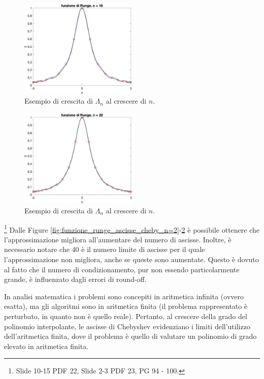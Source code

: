 \begin{figure}
	\centering
	\includegraphics[width=0.5\textwidth]{immagini/funzione_runge_ascisse_cheby_n=18.jpg}
	\caption{Esempio di crescita di $\Lambda_n$ al crescere di $n$.}\label{fig:funzione_runge_ascisse_cheby_n=18}
\end{figure}

\begin{figure}
	\centering
	\includegraphics[width=0.5\textwidth]{immagini/funzione_runge_ascisse_cheby_n=22.jpg}
	\caption{Esempio di crescita di $\Lambda_n$ al crescere di $n$.}\label{fig:funzione_runge_ascisse_cheby_n=22}
\end{figure}

 \footnote{Slide 10-15 PDF 22, Slide 2-3 PDF 23, PG 94 - 100.} Dalle Figure \ref{fig:funzione_runge_ascisse_cheby_n=2}-\ref{fig:funzione_runge_ascisse_cheby_n=22} è possibile ottenere che l'approssimazione migliora all'aumentare del numero di ascisse. Inoltre, è necessario notare che 40 è il numero limite di ascisse per il quale l'approssimazione non migliora, anche se queste sono aumentate. Questo è dovuto al fatto che il numero di condizionamento, pur non essendo particolarmente grande, è influenzato dagli errori di round-off.

In analisi matematica i problemi sono concepiti in aritmetica infinita (ovvero esatta),  ma gli algoritmi sono in aritmetica finita (il problema rappresentato è perturbato, in quanto non è quello reale). Pertanto, al crescere della grado del polinomio interpolante, le ascisse di Chebyshev evidenziano i limiti dell'utilizzo dell'aritmetica finita, dove il problema è quello di valutare un polinomio di grado elevato in aritmetica finita.

